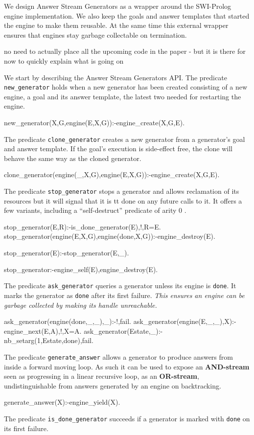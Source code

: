 \documentclass{new_tlp}
\begin{document}
We design Answer Stream Generators as a wrapper around the SWI-Prolog engine implementation.
We also keep the goals and answer templates that started the engine to make them reusable. At the same time this external wrapper ensures that engines stay garbage collectable on termination.


{\Large no need to actually place all the upcoming code in the paper - but it is there for now to quickly explain what is going on}

We start by describing the Answer Stream Generators API.
The predicate {\tt new\_generator} holds when a new generator has been created
consisting of a new engine, a goal and its answer template, the latest two needed
for restarting the engine.
\begin{code}
new_generator(X,G,engine(E,X,G)):-engine_create(X,G,E).
\end{code}

The predicate  {\tt clone\_generator} creates a new generator from a generator's goal and answer template. If the goal's execution is side-effect free, the clone will behave the same way as the cloned generator.
\begin{code}
clone_generator(engine(_,X,G),engine(E,X,G)):-engine_create(X,G,E).
\end{code}

The predicate {\tt stop\_generator} stops a generator and allows reclamation of its resources but it will signal that it is {tt done} on any future calls to it.
It offers a few variants, including a ``self-destruct'' predicate of arity 0 .
\begin{code}
stop_generator(E,R):-is_done_generator(E),!,R=E.
stop_generator(engine(E,X,G),engine(done,X,G)):-engine_destroy(E).

stop_generator(E):-stop_generator(E,_).

stop_generator:-engine_self(E),engine_destroy(E).
\end{code}

The predicate {\tt ask\_generator} queries a generator unless its engine is {\tt done}.
It marks the generator as {\tt done} after its first failure.
{\em This ensures an engine can be garbage collected by making its handle unreachable.}
\begin{code}  
ask_generator(engine(done,_,_),_):-!,fail.
ask_generator(engine(E,_,_),X):-engine_next(E,A),!,X=A.
ask_generator(Estate,_):-nb_setarg(1,Estate,done),fail.  
\end{code}

The predicate {\tt generate\_answer} allows a generator to produce answers from inside a forward moving loop. As such it can be used to expose an {\bf AND-stream} seen as progressing  in a linear recursive loop, as an {\bf OR-stream}, undistinguishable from answers generated by an engine on backtracking.
\begin{code}
generate_answer(X):-engine_yield(X).
\end{code}
The predicate {\tt is\_done\_generator} succeeds if a generator is marked with {\tt done} on its first failure.
\end{document}
